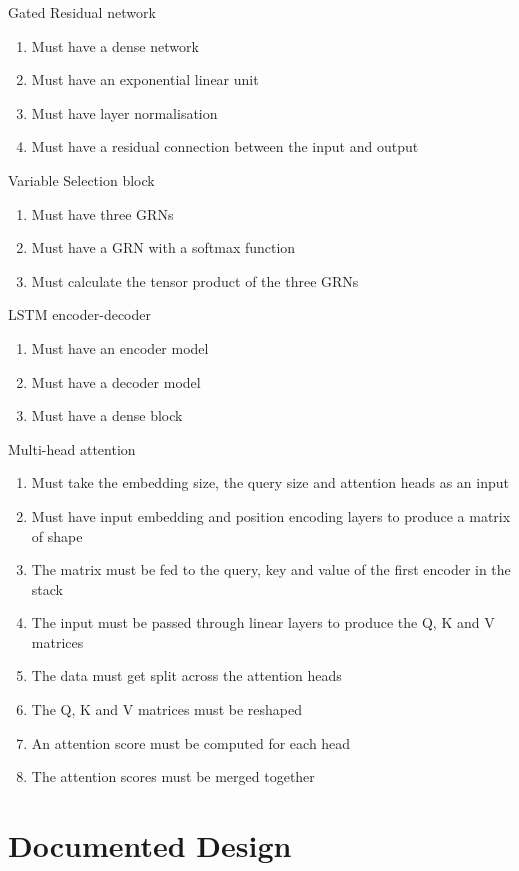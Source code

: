 \documentclass{article}
\begin{document}
Gated Residual network
\begin{enumerate}
    \item Must have a dense network
    \item Must have an exponential linear unit
    \item Must have layer normalisation
    \item Must have a residual connection between the input and output
\end{enumerate}
Variable Selection block
\begin{enumerate}
    \item Must have three GRNs
    \item Must have a GRN with a softmax function
    \item Must calculate the tensor product of the three GRNs
\end{enumerate}
LSTM encoder-decoder
\begin{enumerate}
    \item Must have an encoder model
    \item Must have a decoder model
    \item Must have a dense block
\end{enumerate}
Multi-head attention
\begin{enumerate}
    \item Must take the embedding size, the query size and attention heads as an input
    \item Must have input embedding and position encoding layers to produce a matrix of shape
    \item The matrix must be fed to the query, key and value of the first encoder in the stack
    \item The input must be passed through linear layers to produce the Q, K and V matrices
    \item The data must get split across the attention heads
    \item The Q, K and V matrices must be reshaped
    \item An attention score must be computed for each head
    \item The attention scores must be merged together
\end{enumerate}



\clearpage
\section{Documented Design}
\end{document}
